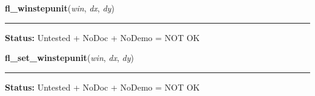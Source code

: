     \label{xformslib:library:fl_winstepsize}

    \vspace{0.5ex}

\hspace{.8\funcindent}\begin{boxedminipage}{\funcwidth}

    \raggedright \textbf{fl\_winstepunit}(\textit{win}, \textit{dx}, \textit{dy})

    \vspace{-1.5ex}

    \rule{\textwidth}{0.5\fboxrule}
\setlength{\parskip}{2ex}
\setlength{\parskip}{1ex}
\textbf{Status:} Untested + NoDoc + NoDemo = NOT OK



    \end{boxedminipage}

    \label{xformslib:library:fl_winstepsize}

    \vspace{0.5ex}

\hspace{.8\funcindent}\begin{boxedminipage}{\funcwidth}

    \raggedright \textbf{fl\_set\_winstepunit}(\textit{win}, \textit{dx}, \textit{dy})

    \vspace{-1.5ex}

    \rule{\textwidth}{0.5\fboxrule}
\setlength{\parskip}{2ex}
\setlength{\parskip}{1ex}
\textbf{Status:} Untested + NoDoc + NoDemo = NOT OK



    \end{boxedminipage}

    \label{xformslib:library:fl_winisvalid}

    \vspace{0.5ex}

